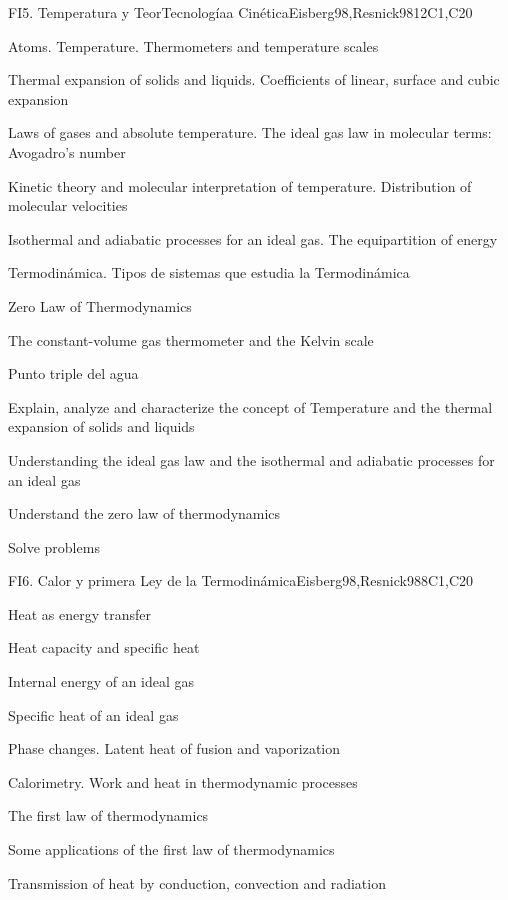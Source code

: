 \begin{syllabus}
\begin{unit}{FI5. Temperatura y TeorTecnologíaa Cinética}{}{Eisberg98,Resnick98}{12}{C1,C20}
\begin{topics}
         \item  Atoms. Temperature. Thermometers and temperature scales
	 \item  Thermal expansion of solids and liquids. Coefficients of linear, surface and cubic expansion
         \item  Laws of gases and absolute temperature. The ideal gas law in molecular terms: Avogadro's number
	 \item  Kinetic theory and molecular interpretation of temperature. Distribution of molecular velocities
         \item  Isothermal and adiabatic processes for an ideal gas. The equipartition of energy
	 \item  Termodinámica. Tipos de sistemas que estudia la Termodinámica
         \item  Zero Law of Thermodynamics
	 \item  The constant-volume gas thermometer and the Kelvin scale
         \item  Punto triple del agua
   \end{topics}

   \begin{learningoutcomes}
         \item  Explain, analyze and characterize the concept of Temperature and the thermal expansion of solids and liquids
         \item  Understanding the ideal gas law and the isothermal and adiabatic processes for an ideal gas
         \item  Understand the zero law of thermodynamics
         \item  Solve problems
   \end{learningoutcomes}
\end{unit}

\begin{unit}{FI6. Calor y primera Ley de la Termodinámica}{}{Eisberg98,Resnick98}{8}{C1,C20}
\begin{topics}
         \item  Heat as energy transfer
	 \item  Heat capacity and specific heat
         \item  Internal energy of an ideal gas
	 \item  Specific heat of an ideal gas
         \item  Phase changes. Latent heat of fusion and vaporization
	 \item  Calorimetry. Work and heat in thermodynamic processes
         \item  The first law of thermodynamics
	 \item  Some applications of the first law of thermodynamics
         \item  Transmission of heat by conduction, convection and radiation
   \end{topics}


\end{unit}
\end{syllabus}
